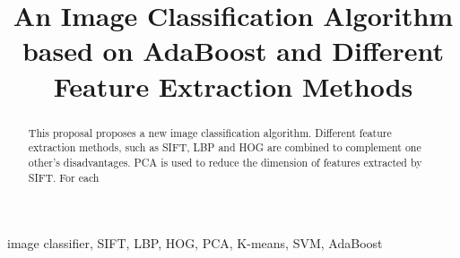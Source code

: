 \documentclass[conference]{IEEEtran}
\begin{document}
\title{An Image Classification Algorithm based on AdaBoost and Different Feature Extraction Methods\\
}

\author{
\and
{}
}

\maketitle

\begin{abstract}
This proposal proposes a new image classification algorithm. Different feature extraction methods, such as SIFT, LBP and HOG are combined to complement one other's disadvantages. PCA is used to reduce the dimension of features extracted by SIFT. For each 
\end{abstract}

\begin{IEEEkeywords}
image classifier, SIFT, LBP, HOG, PCA, K-means, SVM, AdaBoost 
\end{IEEEkeywords}
\end{document}
